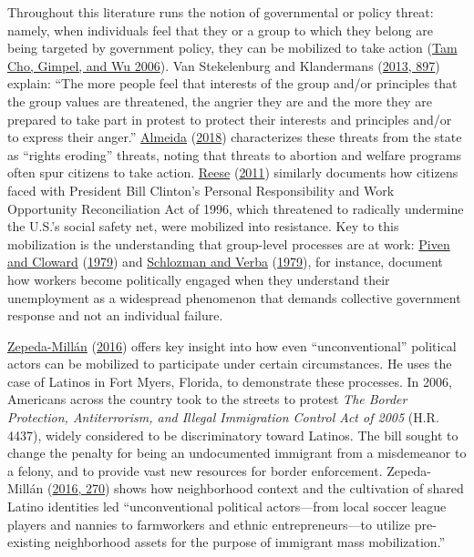 \documentclass[
  12pt,
]{article}
\begin{document}
Throughout this literature runs the notion of governmental or policy threat: namely, when individuals feel that they or a group to which they belong are being targeted by government policy, they can be mobilized to take action (\protect\hyperlink{ref-TamCho2006a}{Tam Cho, Gimpel, and Wu 2006}). Van Stekelenburg and Klandermans (\protect\hyperlink{ref-vanStekelenburg2013}{2013, 897}) explain: ``The more people feel that interests of the group and/or principles that the group values are threatened, the angrier they are and the more they are prepared to take part in protest to protect their interests and principles and/or to express their anger.'' \protect\hyperlink{ref-Almeida2018}{Almeida} (\protect\hyperlink{ref-Almeida2018}{2018}) characterizes these threats from the state as ``rights eroding'' threats, noting that threats to abortion and welfare programs often spur citizens to take action. \protect\hyperlink{ref-Reese2011}{Reese} (\protect\hyperlink{ref-Reese2011}{2011}) similarly documents how citizens faced with President Bill Clinton's Personal Responsibility and Work Opportunity Reconciliation Act of 1996, which threatened to radically undermine the U.S.'s social safety net, were mobilized into resistance. Key to this mobilization is the understanding that group-level processes are at work: \protect\hyperlink{ref-Piven1979}{Piven and Cloward} (\protect\hyperlink{ref-Piven1979}{1979}) and \protect\hyperlink{ref-Schlozman1979}{Schlozman and Verba} (\protect\hyperlink{ref-Schlozman1979}{1979}), for instance, document how workers become politically engaged when they understand their unemployment as a widespread phenomenon that demands collective government response and not an individual failure.

\protect\hyperlink{ref-Zepeda-Millan2016}{Zepeda-Millán} (\protect\hyperlink{ref-Zepeda-Millan2016}{2016}) offers key insight into how even ``unconventional'' political actors can be mobilized to participate under certain circumstances. He uses the case of Latinos in Fort Myers, Florida, to demonstrate these processes. In 2006, Americans across the country took to the streets to protest \emph{The Border Protection, Antiterrorism, and Illegal Immigration Control Act of 2005} (H.R. 4437), widely considered to be discriminatory toward Latinos. The bill sought to change the penalty for being an undocumented immigrant from a misdemeanor to a felony, and to provide vast new resources for border enforcement. Zepeda-Millán (\protect\hyperlink{ref-Zepeda-Millan2016}{2016, 270}) shows how neighborhood context and the cultivation of shared Latino identities led ``unconventional political actors---from local soccer league players and nannies to farmworkers and ethnic entrepreneurs---to utilize pre-existing neighborhood assets for the purpose of immigrant mass mobilization.''
\end{document}
